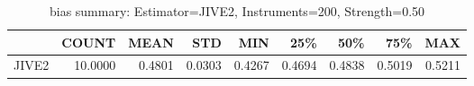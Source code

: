 \begin{table}[ht]
\centering
\caption{bias summary: Estimator=JIVE2, Instruments=200, Strength=0.50}
\begin{tabular}{lrrrrrrrr}
\toprule
 & COUNT & MEAN & STD & MIN & 25\% & 50\% & 75\% & MAX \\
\midrule
JIVE2 & 10.0000 & 0.4801 & 0.0303 & 0.4267 & 0.4694 & 0.4838 & 0.5019 & 0.5211 \\
\bottomrule
\end{tabular}
\end{table}
